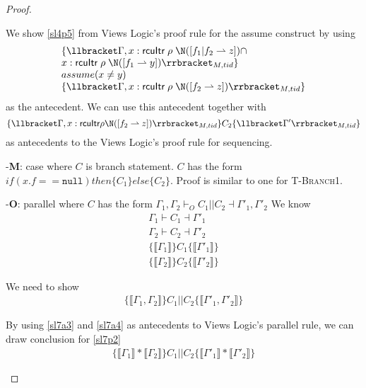 \begin{proof}
\begin{case}
We show \ref{sl4p5} from Views Logic's proof rule for the assume construct by using 
      \[
      \begin{array}{l}
      \{\llbracket \Gamma, x:\textsf{rcuItr}\;\rho\;\N([f_1 | f_2 \rightharpoonup z]) \cap\\
      x:\textsf{rcuItr}\;\rho\;\N([f_1 \rightharpoonup y]) \rrbracket_{M,tid} \}\\
      assume(x\neq y)\\
      \{\llbracket  \Gamma,x:\textsf{rcuItr}\;\rho\;\N([f_2 \rightharpoonup z]) \rrbracket_{M,tid} \}
      \end{array}
      \]
      as the antecedent. We can use this antecedent together with 
      \[ \{\llbracket\Gamma,   x:\textsf{rcuItr}\rho\N([f_2  \rightharpoonup z])\rrbracket_{M,tid}\} C_2 \{\llbracket\Gamma' \rrbracket_{M,tid}\} \]
      as antecedents to the Views Logic's proof rule for sequencing.
  \end{case}
  
  \begin{case}-\textbf{M}: case where $C$ is branch statement. $C$ has the form $if(x.f == \texttt{null})then\{C_1\}else\{C_2\}$.
    Proof is similar to one for \textsc{T-Branch1}.
   \end{case}

\begin{case}-\textbf{O}: parallel where $C$ has the form $\Gamma_1,\Gamma_2\vdash_{O} C_1 || C_2 \dashv \Gamma'_1,\Gamma'_2$
We know 
\begin{gather} \label{sl7a1}
\Gamma_1 \vdash C_1 \dashv \Gamma'_1\\
\label{sl7a2}
\Gamma_2 \vdash C_2 \dashv \Gamma'_2\\
\label{sl7a3}
\{ \llbracket \Gamma_1 \rrbracket \} C_1 \{ \llbracket \Gamma'_1 \rrbracket\}\\
\label{sl7a4}
\{ \llbracket \Gamma_2 \rrbracket \} C_2  \{ \llbracket \Gamma'_2 \rrbracket \}
\end{gather}

We need to show 
\begin{gather}\label{sl7p1}
\{\llbracket \Gamma_1, \Gamma_2 \rrbracket \} C_1 || C_2 \{\llbracket \Gamma'_1, \Gamma'_2 \rrbracket \}
\end{gather}

By using \ref{sl7a3} and \ref{sl7a4} as antecedents to Views Logic's parallel rule, we can draw conclusion for \ref{sl7p2}
\begin{gather}\label{sl7p2}
\{\llbracket \Gamma_1 \rrbracket * \llbracket \Gamma_2 \rrbracket\} C_1 || C_2\{\llbracket \Gamma'_1 \rrbracket * \llbracket \Gamma'_2 \rrbracket\}
\end{gather}


\end{case}
\end{proof}
